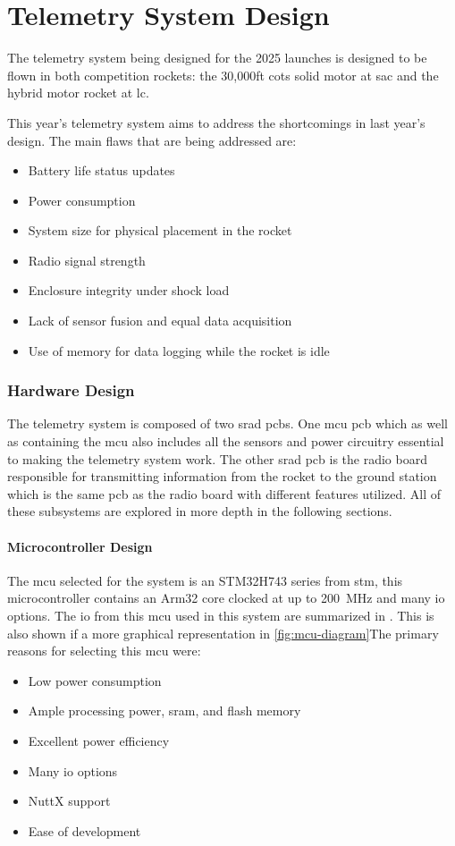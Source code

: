 \part{Telemetry System Design}

The telemetry system being designed for the 2025 launches is designed to be flown in both competition rockets: the
30,000ft \gls{cots} solid motor at \gls{sac} and the hybrid motor rocket at \gls{lc}.

This year's telemetry system aims to address the shortcomings in last year's design. The main flaws that are being
addressed are:

\begin{itemize}
    \item Battery life status updates
    \item Power consumption
    \item System size for physical placement in the rocket
    \item Radio signal strength
    \item Enclosure integrity under shock load
    \item Lack of sensor fusion and equal data acquisition
    \item Use of memory for data logging while the rocket is idle
\end{itemize}

\section{Hardware Design}
The telemetry system is composed of two \gls{srad} \gls{pcb}s. One \gls{mcu} \gls{pcb} which as well as containing the \gls{mcu} also includes all the sensors and power circuitry essential to making the telemetry system work. The other \gls{srad} \gls{pcb} is the radio board responsible for transmitting information from the rocket to the ground station which is the same \gls{pcb} as the radio board with different features utilized. All of these subsystems are explored in more depth in the following sections.


\subsection{Microcontroller Design}
The \gls{mcu} selected for the system is an STM32H743 series from \gls{stm}, this microcontroller contains an Arm32 core clocked at up to \qty{200}{\mega\hertz} and many \gls{io} options. The \gls{io} from this \gls{mcu} used in this system are summarized in . This is also shown if a more graphical representation in \cref{fig:mcu-diagram}The primary reasons for selecting this \gls{mcu} were: \begin{itemize}
    \item Low power consumption
    \item Ample processing power, \gls{sram}, and flash memory
    \item Excellent power efficiency
    \item Many \gls{io} options
    \item NuttX support
    \item Ease of development
\end{itemize}

